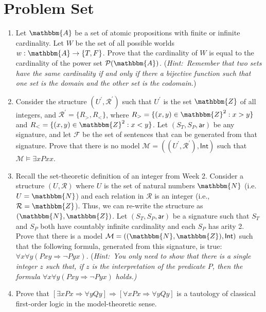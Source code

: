 \documentclass[11pt]{article}
\theoremstyle{definition}
\theoremstyle{remark}
\begin{document}
\section*{Problem Set}
\begin{enumerate}
    \item Let $\mathbbm{A}$ be a set of atomic propositions with finite or infinite cardinality. Let $W$ be the set of all possible worlds $w:\mathbbm{A}\rightarrow\{T,F\}$. Prove that the cardinality of $W$ is equal to the cardinality of the power set $\mathcal{P}(\mathbbm{A})$. (\textit{Hint:\ Remember that two sets have the same cardinality if and only if there a bijective function such that one set is the domain and the other set is the codomain.})

    \item Consider the structure $(U^{\prime},\mathcal{R}^{\prime})$ such that $U^{\prime}$ is the set $\mathbbm{Z}$ of all integers, and $\mathcal{R}^{\prime}=\{R_{>},R_{<}\}$, where $R_{>}=\{(x,y)\in\mathbbm{Z}^{2}:x>y\}$ and $R_{<}=\{(x,y)\in\mathbbm{Z}^{2}:x<y\}$. Let $(S_{T}, S_{P},\textsf{ar})$ be any signature, and let $\mathcal{F}$ be the set of sentences that can be generated from that signature. Prove that there is no model $\mathcal{M}=((U^{\prime},\mathcal{R}^{\prime}),\textsf{Int})$ such that $\mathcal{M}\vDash \exists x Pxx$.

    \item Recall the set-theoretic definition of an integer from Week 2. Consider a structure $(U,\mathcal{R})$ where $U$ is the set of natural numbers $\mathbbm{N}$ (i.e. $U=\mathbbm{N}$) and each relation in $\mathcal{R}$ is an integer (i.e., $\mathcal{R}=\mathbbm{Z}$). Thus, we can re-write the structure as $(\mathbbm{N},\mathbbm{Z})$. Let $(S_{T}, S_{P},\textsf{ar})$ be a signature such that $S_{T}$ and $S_{P}$ both have countably infinite cardinality and each $S_{P}$ has arity 2. Prove that there is a model $\mathcal{M}=((\mathbbm{N},\mathbbm{Z}),\textsf{Int})$ such that the following formula, generated from this signature, is true:\ $\forall x \forall y (Pxy\Rightarrow \neg Pyx)$. (\textit{Hint:\ You only need to show that there is a single integer $z$ such that, if $z$ is the interpretation of the predicate $P$, then the formula $\forall x \forall y (Pxy\Rightarrow \neg Pyx)$ holds.)}

    \item Prove that $[\exists xPx\Rightarrow \forall y Qy]\Rightarrow [\forall xPx \Rightarrow \forall y Qy]$ is a tautology of classical first-order logic in the model-theoretic sense.
\end{enumerate}
\end{document}
